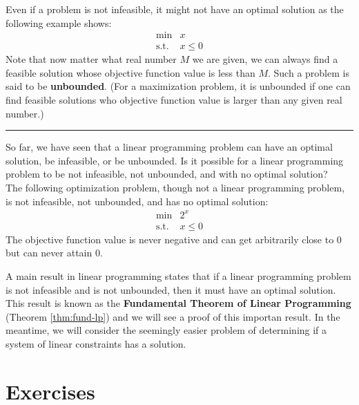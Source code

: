 \documentclass[]{book}
\theoremstyle{definition}
\theoremstyle{definition}
\theoremstyle{remark}
\begin{document}
Even if a problem is not infeasible, it might not have an optimal
solution as the following example shows: \[
\begin{array}{rl}
\min & x \\
\text{s.t.} &  x \leq 0
\end{array}
\] Note that now matter what real number \(M\) we are given, we can
always find a feasible solution whose objective function value is less
than \(M\). Such a problem is said to be \textbf{unbounded}. (For a
maximization problem, it is unbounded if one can find feasible solutions
who objective function value is larger than any given real number.)

\begin{center}\rule{0.5\linewidth}{\linethickness}\end{center}

So far, we have seen that a linear programming problem can have an
optimal solution, be infeasible, or be unbounded. Is it possible for a
linear programming problem to be not infeasible, not unbounded, and with
no optimal solution?\\
The following optimization problem, though not a linear programming
problem, is not infeasible, not unbounded, and has no optimal solution:
\[
\begin{array}{rl}
\min & 2^x \\
\text{s.t.} &  x \leq 0
\end{array}
\] The objective function value is never negative and can get
arbitrarily close to 0 but can never attain 0.

A main result in linear programming states that if a linear programming
problem is not infeasible and is not unbounded, then it must have an
optimal solution. This result is known as the \textbf{Fundamental
Theorem of Linear Programming} (Theorem \ref{thm:fund-lp}) and we will
see a proof of this importan result. In the meantime, we will consider
the seemingly easier problem of determining if a system of linear
constraints has a solution.

\section*{Exercises}\label{exercises-1}
\end{document}
